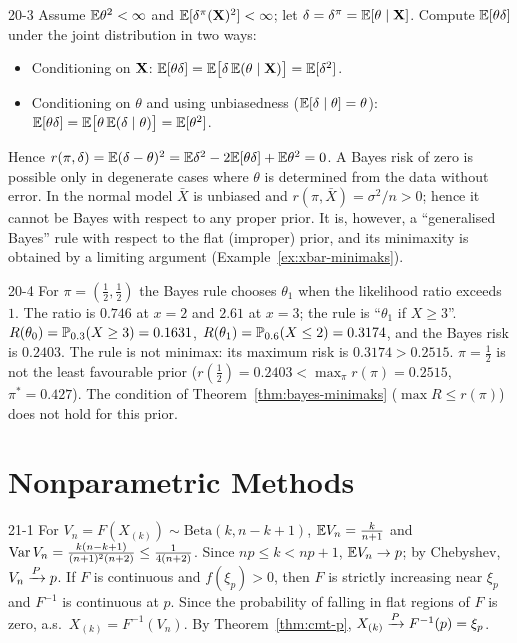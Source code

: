 \begin{solution}{20-3}
Assume $\E\theta^2<\infty$ and $\E[\delta^\pi(\X)^2]<\infty$; let $\delta=\delta^\pi=\E[\theta\mid\X]$. Compute $\E[\theta\delta]$ under the joint distribution in two ways:
\begin{itemize}
  \item Conditioning on $\X$: $\E[\theta\delta]=\E\big[\delta\,\E(\theta\mid\X)\big]=\E[\delta^2]$.
  \item Conditioning on $\theta$ and using unbiasedness ($\E[\delta\mid\theta]=\theta$): $\E[\theta\delta]=\E\big[\theta\,\E(\delta\mid\theta)\big]=\E[\theta^2]$.
\end{itemize}
Hence $r(\pi,\delta)=\E(\delta-\theta)^2=\E\delta^2-2\E[\theta\delta]+\E\theta^2=0$. A Bayes risk of zero is possible only in degenerate cases where $\theta$ is determined from the data without error. In the normal model $\bar X$ is unbiased and $r(\pi,\bar X)=\sigma^2/n>0$; hence it cannot be Bayes with respect to any proper prior. It is, however, a ``generalised Bayes'' rule with respect to the flat (improper) prior, and its minimaxity is obtained by a limiting argument (Example~\ref{ex:xbar-minimaks}).
\end{solution}

\begin{solution}{20-4}
For $\pi=(\frac12,\frac12)$ the Bayes rule chooses $\theta_1$ when the likelihood ratio exceeds $1$. The ratio is $0.746$ at $x=2$ and $2.61$ at $x=3$; the rule is ``$\theta_1$ if $X\ge3$''. $R(\theta_0)=\P_{0.3}(X\ge3)=0.1631$, $R(\theta_1)=\P_{0.6}(X\le2)=0.3174$, and the Bayes risk is $0.2403$. The rule is not minimax: its maximum risk is $0.3174>0.2515$. $\pi=\frac12$ is not the least favourable prior ($r(\frac12)=0.2403<\max_\pi r(\pi)=0.2515$, $\pi^*=0.427$). The condition of Theorem~\ref{thm:bayes-minimaks} ($\max R\le r(\pi)$) does not hold for this prior.
\end{solution}

\section{Nonparametric Methods}

\begin{solution}{21-1}
For $V_n=F(X_{(k)})\sim\text{Beta}(k,n-k+1)$, $\E V_n=\frac k{n+1}$ and $\Var V_n=\frac{k(n-k+1)}{(n+1)^2(n+2)}\le\frac1{4(n+2)}$. Since $np\le k<np+1$, $\E V_n\to p$; by Chebyshev, $V_n\pto p$. If $F$ is continuous and $f(\xi_p)>0$, then $F$ is strictly increasing near $\xi_p$ and $F^{-1}$ is continuous at $p$. Since the probability of falling in flat regions of $F$ is zero, a.s.\ $X_{(k)}=F^{-1}(V_n)$. By Theorem~\ref{thm:cmt-p}, $X_{(k)}\pto F^{-1}(p)=\xi_p$.
\end{solution}

